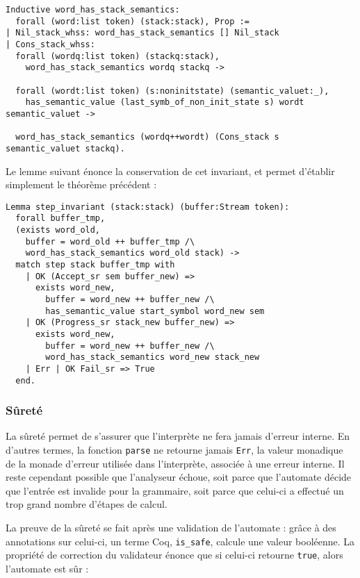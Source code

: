 \documentclass[a4paper,11pt]{article}
\begin{document}
\begin{verbatim}
Inductive word_has_stack_semantics:
  forall (word:list token) (stack:stack), Prop :=
| Nil_stack_whss: word_has_stack_semantics [] Nil_stack
| Cons_stack_whss:
  forall (wordq:list token) (stackq:stack),
    word_has_stack_semantics wordq stackq ->

  forall (wordt:list token) (s:noninitstate) (semantic_valuet:_),
    has_semantic_value (last_symb_of_non_init_state s) wordt semantic_valuet ->

  word_has_stack_semantics (wordq++wordt) (Cons_stack s semantic_valuet stackq).
\end{verbatim}

Le lemme suivant énonce la conservation de cet invariant, et permet
d'établir simplement le théorème précédent :

\begin{verbatim}
Lemma step_invariant (stack:stack) (buffer:Stream token):
  forall buffer_tmp,
  (exists word_old,
    buffer = word_old ++ buffer_tmp /\
    word_has_stack_semantics word_old stack) ->
  match step stack buffer_tmp with
    | OK (Accept_sr sem buffer_new) =>
      exists word_new,
        buffer = word_new ++ buffer_new /\
        has_semantic_value start_symbol word_new sem
    | OK (Progress_sr stack_new buffer_new) =>
      exists word_new,
        buffer = word_new ++ buffer_new /\
        word_has_stack_semantics word_new stack_new
    | Err | OK Fail_sr => True
  end.
\end{verbatim}

\subsubsection{Sûreté}

La sûreté permet de s'assurer que l'interprète ne fera jamais d'erreur
interne. En d'autres termes, la fonction \verb+parse+ ne retourne
jamais \verb+Err+, la valeur monadique de la monade d'erreur utilisée
dans l'interprète, associée à une erreur interne. Il reste cependant
possible que l'analyseur échoue, soit parce que l'automate décide que
l'entrée est invalide pour la grammaire, soit parce que celui-ci a
effectué un trop grand nombre d'étapes de calcul.

La preuve de la sûreté se fait après une validation de l'automate :
grâce à des annotations sur celui-ci, un terme Coq, \verb+is_safe+,
calcule une valeur booléenne. La propriété de correction du validateur
énonce que si celui-ci retourne \verb+true+, alors l'automate est sûr :
\end{document}
